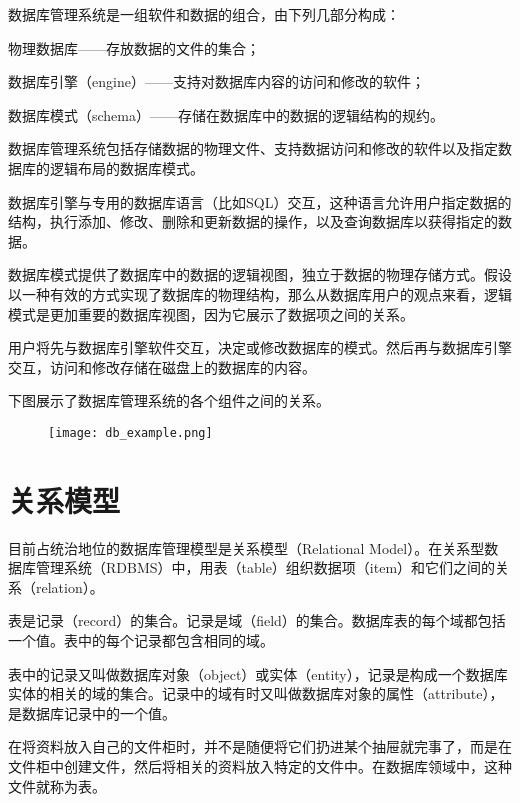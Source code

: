数据库管理系统是一组软件和数据的组合，由下列几部分构成：

\begin{compactitem}
\item 物理数据库——存放数据的文件的集合；
\item 数据库引擎（engine）——支持对数据库内容的访问和修改的软件；
\item 数据库模式（schema）——存储在数据库中的数据的逻辑结构的规约。
\end{compactitem}

数据库管理系统包括存储数据的物理文件、支持数据访问和修改的软件以及指定数据库的逻辑布局的数据库模式。

数据库引擎与专用的数据库语言（比如SQL）交互，这种语言允许用户指定数据的结构，执行添加、修改、删除和更新数据的操作，以及查询数据库以获得指定的数据。

数据库模式提供了数据库中的数据的逻辑视图，独立于数据的物理存储方式。假设以一种有效的方式实现了数据库的物理结构，那么从数据库用户的观点来看，逻辑模式是更加重要的数据库视图，因为它展示了数据项之间的关系。

用户将先与数据库引擎软件交互，决定或修改数据库的模式。然后再与数据库引擎交互，访问和修改存储在磁盘上的数据库的内容。

下图展示了数据库管理系统的各个组件之间的关系。

\begin{figure}[!h]
\centering
\texttt{[image: db\_example.png]}
\label{db_example}
\end{figure}



\section{关系模型}


目前占统治地位的数据库管理模型是关系模型（Relational Model）。在关系型数据库管理系统（RDBMS）中，用表（table）组织数据项（item）和它们之间的关系（relation）。

表是记录（record）的集合。记录是域（field）的集合。数据库表的每个域都包括一个值。表中的每个记录都包含相同的域。

表中的记录又叫做数据库对象（object）或实体（entity），记录是构成一个数据库实体的相关的域的集合。记录中的域有时又叫做数据库对象的属性（attribute），是数据库记录中的一个值。

在将资料放入自己的文件柜时，并不是随便将它们扔进某个抽屉就完事了，而是在文件柜中创建文件，然后将相关的资料放入特定的文件中。在数据库领域中，这种文件就称为表。

